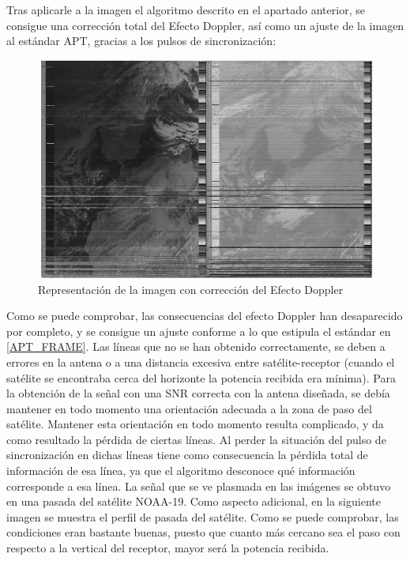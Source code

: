 \documentclass[a4paper,openright,12pt]{article}
\begin{document}
 Tras aplicarle a la imagen el algoritmo descrito en el apartado anterior, se consigue una corrección total del Efecto Doppler, así como un ajuste de la imagen al estándar APT, gracias a los pulsos de sincronización:

 \begin{figure}[hbtp]
 \centering
 \includegraphics[width = 15cm]{imagenes/31_01_synch.png}
 \caption{Representación de la imagen con corrección del Efecto Doppler}
 \label{apt_corrected}
 \end{figure}
 
 Como se puede comprobar, las consecuencias del efecto Doppler han desaparecido por completo, y se consigue un ajuste conforme a lo que estipula el estándar en \ref{APT_FRAME}. Las líneas que no se han obtenido correctamente, se deben a errores en la antena o a una distancia excesiva entre satélite-receptor (cuando el satélite se encontraba cerca del horizonte la potencia recibida era mínima). Para la obtención de la señal con una SNR correcta con la antena diseñada, se debía mantener en todo momento una orientación adecuada a la zona de paso del satélite. Mantener esta orientación en todo momento resulta complicado, y da como resultado la pérdida de ciertas líneas. Al perder la situación del pulso de sincronización en   dichas líneas tiene como consecuencia la pérdida total de información de esa línea, ya que el algoritmo desconoce qué información corresponde a esa línea. La señal que se ve plasmada en las imágenes se obtuvo en una pasada del satélite NOAA-19. Como aspecto adicional, en la siguiente imagen se muestra el perfil de pasada del satélite. Como se puede comprobar, las condiciones eran bastante buenas, puesto que cuanto más cercano sea el paso con respecto a la  vertical del receptor, mayor será la potencia recibida.
 
\end{document}
